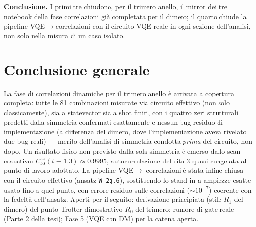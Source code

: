 \documentclass[11pt,a4paper]{article}
\begin{document}
\textbf{Conclusione.} I primi tre chiudono, per il trimero anello, il mirror dei tre
notebook della fase correlazioni già completata per il dimero; il quarto chiude la
pipeline VQE$\to$correlazioni con il circuito VQE reale in ogni sezione dell'analisi, non
solo nella misura di un caso isolato.

\section*{Conclusione generale}

La fase di correlazioni dinamiche per il trimero anello è arrivata a copertura
completa: tutte le 81 combinazioni misurate via circuito effettivo (non solo
classicamente), sia a statevector sia a shot finiti, con i quattro zeri
strutturali predetti dalla simmetria confermati esattamente e nessun bug residuo
di implementazione (a differenza del dimero, dove l'implementazione aveva rivelato
due bug reali) — merito dell'analisi di simmetria condotta \emph{prima} del
circuito, non dopo. Un risultato fisico non previsto dalla sola simmetria è emerso
dallo scan esaustivo: $C_{33}^{zz}(t{=}1.3)\approx0.9995$, autocorrelazione
del sito 3 quasi congelata al punto di lavoro adottato. La pipeline VQE$\to$
correlazioni è stata infine chiusa con il circuito effettivo (ansatz \texttt{W-2q.6}),
sostituendo lo stand-in a ampiezze esatte usato fino a quel punto, con errore
residuo sulle correlazioni ($\sim10^{-7}$) coerente con la fedeltà dell'ansatz.
Aperti per il seguito: derivazione principiata (stile $R_1$ del dimero) del punto
Trotter dimostrativo $R_0$ del trimero; rumore di gate reale (Parte 2 della tesi);
Fase 5 (VQE con DM) per la catena aperta.
\end{document}
